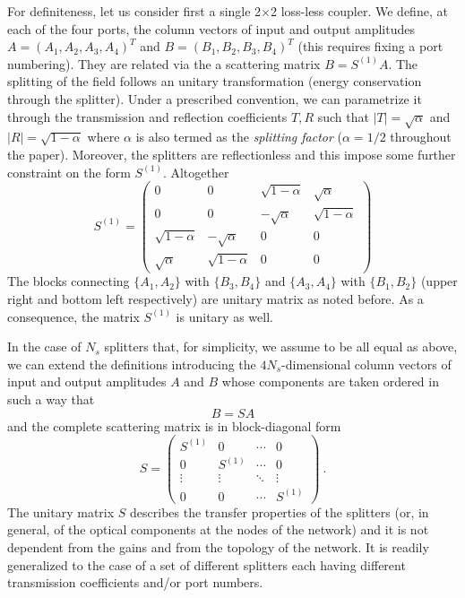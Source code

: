 \documentclass[aps,prl,twocolumn,showpacs,amsmath,amssymb,floatfix,superscriptaddress,
]{revtex4-1}
\begin{document}
For definiteness, let us consider first a single 2$\times$2 loss-less coupler.
We define, at each of the four ports, the column vectors of input and output amplitudes 
$A = (A_1,A_2,A_3,A_4)^T$ and  $B = (B_1,B_2,B_3,B_4)^T$ (this requires fixing 
a port numbering). They are related via the a scattering matrix $B = S^{(1)}A$.
The splitting of the field follows an unitary transformation (energy conservation through the splitter). Under a prescribed convention, we can parametrize it through 
the transmission and reflection coefficients $T,R$ such that $|T|=\sqrt{\alpha}$ and  
$|R|=\sqrt{1-\alpha}$ where $\alpha$ is also termed 
as the \textit{splitting factor} ($\alpha=1/2$ throughout the paper). 
Moreover, the splitters are reflectionless and this 
impose some further  constraint on the form $S^{(1)}$. Altogether
\begin{equation}
S^{(1)} = \left( \begin{array}{cccc}
0 & 0 & \sqrt{1-\alpha} & \sqrt{\alpha} \\
0 & 0 & -\sqrt{\alpha} & \sqrt{1-\alpha} \\
\sqrt{1-\alpha} & -\sqrt{\alpha} & 0 & 0 \\
\sqrt{\alpha} & \sqrt{1-\alpha} & 0 & 0 \end{array} \right) 
\label{S}
\end{equation}
The blocks connecting $\{A_1,A_2\}$ with $\{B_3,B_4\}$ and $\{A_3,A_4\}$ with $\{B_1,B_2\}$ (upper right and bottom left respectively) are unitary matrix as noted before. 
As a consequence, the matrix $S^{(1)}$ is unitary as well. 


In the case of $N_s$ splitters that, for simplicity, we assume to be all equal as above, 
we can extend the definitions introducing  
the $4N_s$-dimensional column vectors of input and output amplitudes 
$A$ and $B$ whose components are taken ordered in such a way that 
\begin{equation}
B = S A
\label{Smat}
\end{equation}
and the complete scattering matrix is in block-diagonal form 
\[ S  =
 \begin{pmatrix}
  S^{(1)} & 0 & \cdots & 0 \\
  0 & S^{(1)} & \cdots & 0 \\
  \vdots  & \vdots  & \ddots & \vdots  \\
  0 & 0 & \cdots & S^{(1)}
 \end{pmatrix} ~. \]
The unitary matrix $S$ describes the transfer properties of the splitters (or, in general, of the optical components at the nodes of the network) and it is not dependent from the gains 
and from the topology of the network. It is readily generalized to the case
of a set of different splitters each having different transmission coefficients and/or 
port numbers. 
 
\end{document}
